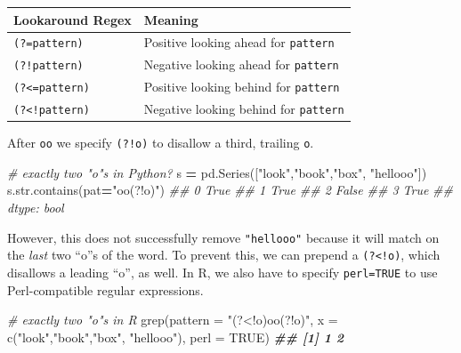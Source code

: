 \documentclass[
  12pt,
  krantz2]{krantz}
\makeatletter
\newenvironment{Shaded}{\begin{snugshade}}{\end{snugshade}}
\newcommand{\AttributeTok}[1]{\textcolor[rgb]{0.61,0.61,0.61}{#1}}
\newcommand{\BuiltInTok}[1]{#1}
\newcommand{\CommentTok}[1]{\textcolor[rgb]{0.37,0.37,0.37}{\textit{#1}}}
\newcommand{\ConstantTok}[1]{\textcolor[rgb]{0,0,0}{#1}}
\newcommand{\DocumentationTok}[1]{\textcolor[rgb]{0.37,0.37,0.37}{\textbf{\textit{#1}}}}
\newcommand{\FunctionTok}[1]{\textcolor[rgb]{0,0,0}{#1}}
\newcommand{\NormalTok}[1]{#1}
\newcommand{\OperatorTok}[1]{\textcolor[rgb]{0.43,0.43,0.43}{\textbf{#1}}}
\newcommand{\StringTok}[1]{\textcolor[rgb]{0.5,0.5,0.5}{#1}}
\newenvironment{kframe}{%
\medskip{}
\setlength{\fboxsep}{.8em}
 \def\at@end@of@kframe{}%
 \ifinner\ifhmode%
  \def\at@end@of@kframe{\end{minipage}}%
  \begin{minipage}{\columnwidth}%
 \fi\fi%
 \def\FrameCommand##1{\hskip\@totalleftmargin \hskip-\fboxsep
 \colorbox{shadecolor}{##1}\hskip-\fboxsep
     \hskip-\linewidth \hskip-\@totalleftmargin \hskip\columnwidth}%
 \MakeFramed {\advance\hsize-\width
   \@totalleftmargin\z@ \linewidth\hsize
   \@setminipage}}%
 {\par\unskip\endMakeFramed%
 \at@end@of@kframe}
\renewenvironment{Shaded}{\begin{kframe}}{\end{kframe}}
\makeatother
\begin{document}
\begin{longtable}[]{@{}ll@{}}
\toprule
Lookaround Regex & Meaning \\
\midrule
\endhead
\texttt{(?=pattern)} & Positive looking ahead for \texttt{pattern} \\
\texttt{(?!pattern)} & Negative looking ahead for \texttt{pattern} \\
\texttt{(?\textless{}=pattern)} & Positive looking behind for \texttt{pattern} \\
\texttt{(?\textless{}!pattern)} & Negative looking behind for \texttt{pattern} \\
\bottomrule
\end{longtable}

After \texttt{oo} we specify \texttt{(?!o)} to disallow a third, trailing \texttt{o}.

\begin{Shaded}
\begin{Highlighting}[]
\CommentTok{\# exactly two "o"s in Python?}
\NormalTok{s }\OperatorTok{=}\NormalTok{ pd.Series([}\StringTok{"look"}\NormalTok{,}\StringTok{"book"}\NormalTok{,}\StringTok{"box"}\NormalTok{, }\StringTok{"hellooo"}\NormalTok{])}
\NormalTok{s.}\BuiltInTok{str}\NormalTok{.contains(pat}\OperatorTok{=}\StringTok{"oo(?!o)"}\NormalTok{)}
\CommentTok{\#\# 0     True}
\CommentTok{\#\# 1     True}
\CommentTok{\#\# 2    False}
\CommentTok{\#\# 3     True}
\CommentTok{\#\# dtype: bool}
\end{Highlighting}
\end{Shaded}

However, this does not successfully remove \texttt{"hellooo"} because it will match on the \emph{last} two ``o''s of the word. To prevent this, we can prepend a \texttt{(?\textless{}!o)}, which disallows a leading ``o'', as well. In R, we also have to specify \texttt{perl=TRUE} to use Perl-compatible regular expressions.

\begin{Shaded}
\begin{Highlighting}[]
\CommentTok{\# exactly two "o"s in R}
\FunctionTok{grep}\NormalTok{(}\AttributeTok{pattern =} \StringTok{"(?\textless{}!o)oo(?!o)"}\NormalTok{, }
     \AttributeTok{x =} \FunctionTok{c}\NormalTok{(}\StringTok{"look"}\NormalTok{,}\StringTok{"book"}\NormalTok{,}\StringTok{"box"}\NormalTok{, }\StringTok{"hellooo"}\NormalTok{), }\AttributeTok{perl =} \ConstantTok{TRUE}\NormalTok{)}
\DocumentationTok{\#\# [1] 1 2}
\end{Highlighting}
\end{Shaded}
\end{document}
